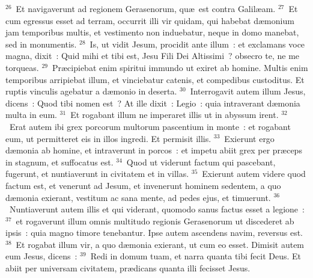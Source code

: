 ${}^{26}$~Et navigaverunt ad regionem Gerasenorum, qu\ae\ est contra Galil\ae am.
${}^{27}$~Et cum egressus esset ad terram, occurrit illi vir quidam, qui habebat d\ae monium jam temporibus multis, et vestimento non induebatur, neque in domo manebat, sed in monumentis.
${}^{28}$~Is, ut vidit Jesum, procidit ante illum~: et exclamans voce magna, dixit~: Quid mihi et tibi est, Jesu Fili Dei Altissimi~? obsecro te, ne me torqueas.
${}^{29}$~Pr\ae cipiebat enim spiritui immundo ut exiret ab homine. Multis enim temporibus arripiebat illum, et vinciebatur catenis, et compedibus custoditus. Et ruptis vinculis agebatur a d\ae monio in deserta.
${}^{30}$~Interrogavit autem illum Jesus, dicens~: Quod tibi nomen est~? At ille dixit~: Legio~: quia intraverant d\ae monia multa in eum.
${}^{31}$~Et rogabant illum ne imperaret illis ut in abyssum irent.
${}^{32}$~Erat autem ibi grex porcorum multorum pascentium in monte~: et rogabant eum, ut permitteret eis in illos ingredi. Et permisit illis.
${}^{33}$~Exierunt ergo d\ae monia ab homine, et intraverunt in porcos~: et impetu abiit grex per pr\ae ceps in stagnum, et suffocatus est.
${}^{34}$~Quod ut viderunt factum qui pascebant, fugerunt, et nuntiaverunt in civitatem et in villas.
${}^{35}$~Exierunt autem videre quod factum est, et venerunt ad Jesum, et invenerunt hominem sedentem, a quo d\ae monia exierant, vestitum ac sana mente, ad pedes ejus, et timuerunt.
${}^{36}$~Nuntiaverunt autem illis et qui viderant, quomodo sanus factus esset a legione~:
${}^{37}$~et rogaverunt illum omnis multitudo regionis Gerasenorum ut discederet ab ipsis~: quia magno timore tenebantur. Ipse autem ascendens navim, reversus est.
${}^{38}$~Et rogabat illum vir, a quo d\ae monia exierant, ut cum eo esset. Dimisit autem eum Jesus, dicens~:
${}^{39}$~Redi in domum tuam, et narra quanta tibi fecit Deus. Et abiit per universam civitatem, pr\ae dicans quanta illi fecisset Jesus.


